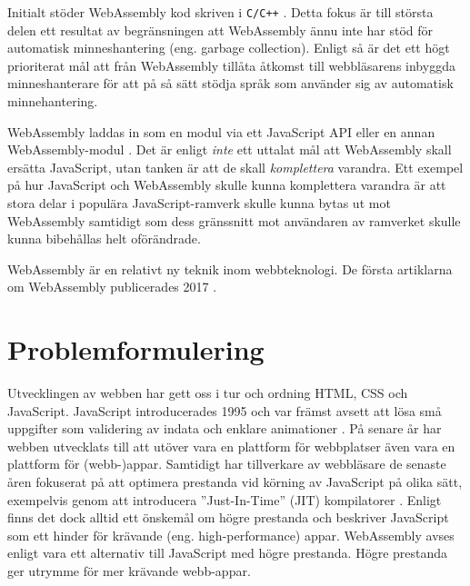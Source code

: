 \documentclass[swedish,template=rapport]{his}
\begin{document}
Initialt stöder WebAssembly kod skriven i \texttt{C/C++} \parencite{HaasRossbergSchuffTitzerHolmanGohmanWagnerZakaiBastien2017}. Detta fokus är till största delen ett resultat av begränsningen att WebAssembly ännu inte har stöd för automatisk minneshantering (eng. garbage collection). Enligt \textcite{HaasRossbergSchuffTitzerHolmanGohmanWagnerZakaiBastien2017} så är det ett högt prioriterat mål att från WebAssembly tillåta åtkomst till webbläsarens inbyggda minneshanterare för att på så sätt stödja språk som använder sig av automatisk minnehantering.

WebAssembly laddas in som en modul via ett JavaScript API eller en annan WebAssembly-modul \parencite{HaasRossbergSchuffTitzerHolmanGohmanWagnerZakaiBastien2017}. Det är enligt \textcite{Moller2018} \emph{inte} ett uttalat mål att WebAssembly skall ersätta JavaScript, utan tanken är att de skall \emph{komplettera} varandra. Ett exempel på hur JavaScript och WebAssembly skulle kunna komplettera varandra är att stora delar i populära JavaScript-ramverk skulle kunna bytas ut mot WebAssembly samtidigt som dess gränssnitt mot användaren av ramverket skulle kunna bibehållas helt oförändrade.

WebAssembly är en relativt ny teknik inom webbteknologi. De första artiklarna om WebAssembly publicerades 2017 \parencite{HaasRossbergSchuffTitzerHolmanGohmanWagnerZakaiBastien2017,ReiserBlaser2017}.

\clearpage

\section{Problemformulering}

Utvecklingen av webben har gett oss i tur och ordning HTML, CSS och JavaScript. JavaScript introducerades 1995 och var främst avsett att lösa små uppgifter som validering av indata och enklare animationer \parencite{Moller2018}. På senare år har webben utvecklats till att utöver vara en plattform för webbplatser även vara en plattform för (webb-)appar. Samtidigt har tillverkare av webbläsare de senaste åren fokuserat på att optimera prestanda vid körning av JavaScript på olika sätt, exempelvis genom att introducera ''Just-In-Time'' (JIT) kompilatorer \parencite{HerreraChenLavoieHendren2018}. Enligt \textcite{ReiserBlaser2017} finns det dock alltid ett önskemål om högre prestanda och \textcite{Zakai2018} beskriver JavaScript som ett hinder för krävande (eng. high-performance) appar. WebAssembly avses enligt \textcite{HaasRossbergSchuffTitzerHolmanGohmanWagnerZakaiBastien2017} vara ett alternativ till JavaScript med högre prestanda. Högre prestanda ger utrymme för mer krävande webb-appar.
\end{document}
